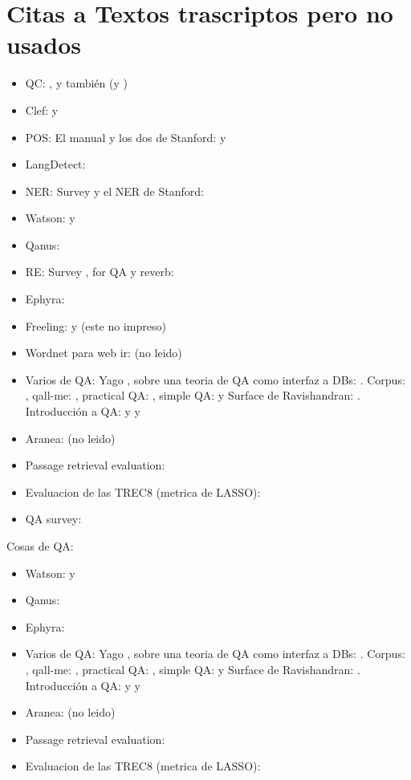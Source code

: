 \section{Citas a Textos trascriptos pero no usados}
\begin{itemize}
\item QC: \cite{QC1}, \cite{QC2} y también \cite{QC3} (y \cite{QC-other})
\item Clef: \cite{GuidelineClef07} y \cite{OverviewClef07} 
\item POS: El manual \cite{POS0} y los dos de Stanford: \cite{POS1} y \cite{POS2}
\item LangDetect: \cite{nakatani2010langdetect}
\item NER: Survey \cite{NER1} y el NER de Stanford: \cite{NER2}
\item Watson: \cite{WATSON1} y \cite{WATSON2}
\item Qanus: \cite{QANUS1}
\item RE: Survey \cite{RE1}, for QA \cite{RE2} y reverb: \cite{RE3}
\item Ephyra: \cite{EPHYRA1}
\item Freeling: \cite{FREELING1} y \cite{FREELING2} (este no impreso)
\item Wordnet para web ir: \cite{WN1} (no leido)
\item Varios de QA: Yago \cite{YAGO-QA1}, sobre una teoria de QA como interfaz a DBs: \cite{QADB1}. Corpus: \cite{TRAIN-QA1}, qall-me: \cite{QALL-ME1}, practical QA: \cite{QAS1}, simple QA: \cite{QAS2} y Surface de Ravishandran: \cite{SURF1}. Introducción a QA: \cite{QA1} y \cite{QA2} y \cite{QA3}
\item Aranea: \cite{ARANEA1} (no leido)
\item Passage retrieval evaluation: \cite{PASSAGE1}
\item Evaluacion de las TREC8 (metrica de \cite{QA3} LASSO): \cite{TREC8}
\item QA survey: \cite{QA-survey}
\end{itemize}


Cosas de QA:
\begin{itemize}
\item Watson: \cite{WATSON1} y \cite{WATSON2}
\item Qanus: \cite{QANUS1}
\item Ephyra: \cite{EPHYRA1}
\item Varios de QA: Yago \cite{YAGO-QA1}, sobre una teoria de QA como interfaz a DBs: \cite{QADB1}. Corpus: \cite{TRAIN-QA1}, qall-me: \cite{QALL-ME1}, practical QA: \cite{QAS1}, simple QA: \cite{QAS2} y Surface de Ravishandran: \cite{SURF1}. Introducción a QA: \cite{QA1} y \cite{QA2} y \cite{QA3}
\item Aranea: \cite{ARANEA1} (no leido)
\item Passage retrieval evaluation: \cite{PASSAGE1}
\item Evaluacion de las TREC8 (metrica de \cite{QA3} LASSO): \cite{TREC8}
\end{itemize}


